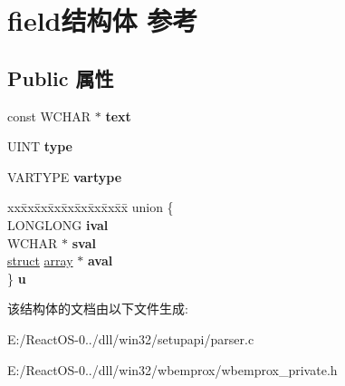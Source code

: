 \hypertarget{structfield}{}\section{field结构体 参考}
\label{structfield}
\subsection*{Public 属性}
\begin{DoxyCompactItemize}
\item 
\mbox{\label{structfield_af903fedc7babaf82756991e23a3289e7}} 
const W\+C\+H\+AR $\ast$ {\bfseries text}
\item 
\mbox{\label{structfield_a01e38415a1548cce1ba7f98c5bcdad14}} 
U\+I\+NT {\bfseries type}
\item 
\mbox{\label{structfield_a031aaa2a8cd1cd1d87440b2b6aede573}} 
V\+A\+R\+T\+Y\+PE {\bfseries vartype}
\item 
\mbox{\label{structfield_a67c35a410593b95d1c0074a5e9be5f8c}} 
\begin{tabbing}
xx\=xx\=xx\=xx\=xx\=xx\=xx\=xx\=xx\=\kill
union \{\\
\>LONGLONG {\bfseries ival}\\
\>WCHAR $\ast$ {\bfseries sval}\\
\>\hyperlink{interfacestruct}{struct} \hyperlink{structarray}{array} $\ast$ {\bfseries aval}\\
\} {\bfseries u}\\

\end{tabbing}\end{DoxyCompactItemize}


该结构体的文档由以下文件生成\+:\begin{DoxyCompactItemize}
\item 
E\+:/\+React\+O\+S-\/0../dll/win32/setupapi/parser.\+c\item 
E\+:/\+React\+O\+S-\/0../dll/win32/wbemprox/wbemprox\+\_\+private.\+h\end{DoxyCompactItemize}
